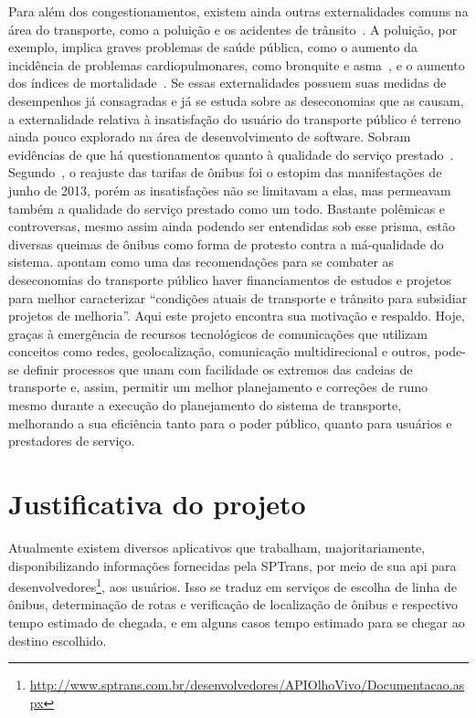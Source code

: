 Para além dos congestionamentos, existem ainda outras externalidades comuns na área do transporte, como a poluição e os acidentes de trânsito~\cite{vasconcellos1998}. A poluição, por exemplo, implica graves problemas de saúde pública, como o aumento da incidência de problemas cardiopulmonares, como bronquite e asma~\cite{kunzli2000}, e o aumento dos índices de mortalidade~\cite{finkelstein2004}.
Se essas externalidades possuem suas medidas de desempenhos já consagradas e já se estuda sobre as deseconomias que as causam, a externalidade relativa à insatisfação do usuário do transporte público é terreno ainda pouco explorado na área de desenvolvimento de software.
Sobram evidências de que há questionamentos quanto à qualidade do serviço prestado~\cite{UrbanaPE2010,Rodrigues,Rodrigues2006,Cellos2012}. Segundo~, o reajuste das tarifas de ônibus foi o estopim das manifestações de junho de 2013, porém as insatisfações não se limitavam a elas, mas permeavam também a qualidade do serviço prestado como um todo. Bastante polêmicas e controversas, mesmo assim ainda podendo ser entendidas sob esse prisma, estão diversas queimas de ônibus como forma de protesto contra a má-qualidade do sistema.  apontam como uma das recomendações para se combater as deseconomias do transporte público haver financiamentos de estudos e projetos para melhor caracterizar “condições atuais de transporte e trânsito para subsidiar projetos de melhoria”.
Aqui este projeto encontra sua motivação e respaldo. Hoje, graças à emergência de recursos tecnológicos de comunicações que utilizam conceitos como redes, geolocalização, comunicação multidirecional e outros, pode-se definir processos que unam com facilidade os extremos das cadeias de transporte e, assim, permitir um melhor planejamento e correções de rumo mesmo durante a execução do planejamento do sistema de transporte, melhorando a sua eficiência tanto para o poder público, quanto para usuários e prestadores de serviço.

\section{Justificativa do projeto}\label{sec:justificativa}
Atualmente existem diversos aplicativos que trabalham, majoritariamente, disponibilizando informações fornecidas pela SPTrans, por meio de sua \gls{api} para desenvolvedores\footnote{\url{http://www.sptrans.com.br/desenvolvedores/APIOlhoVivo/Documentacao.aspx}}, aos usuários. 
Isso se traduz em serviços de escolha de linha de ônibus, determinação de rotas e verificação de localização de ônibus e respectivo tempo estimado de chegada, e em alguns casos tempo estimado para se chegar ao destino escolhido.

